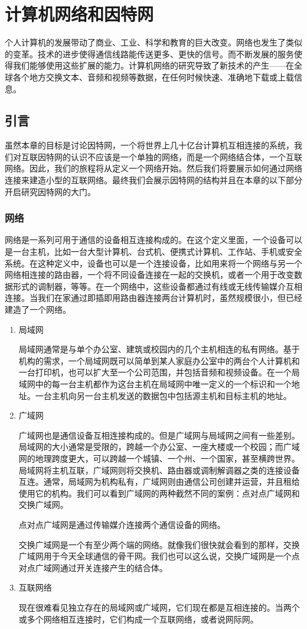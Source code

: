 \chapter{计算机网络和因特网}
个人计算机的发展带动了商业、工业、科学和教育的巨大改变。网络也发生了类似的变革。技术的进步使得通信线路能传送更多、更快的信号。而不断发展的服务使得我们能够使用这些扩展的能力。计算机网络的研究导致了新技术的产生——在全球各个地方交换文本、音频和视频等数据，在任何时候快速、准确地下载或上载信息。
\section{引言}
虽然本章的目标是讨论因特网，一个将世界上几十亿台计算机互相连接的系统，我们对互联因特网的认识不应该是一个单独的网络，而是一个网络结合体，一个互联网络。因此，我们的旅程将从定义一个网络开始。然后我们将要展示如何通过网络连接来建造小型的互联网络。最终我们会展示因特网的结构并且在本章的以下部分开启研究因特网的大门。
\subsection{网络}
网络是一系列可用于通信的设备相互连接构成的。在这个定义里面，一个设备可以是一台主机，比如一台大型计算机、台式机、便携式计算机、工作站、手机或安全系统。在这种定义中，设备也可以是一个连接设备，比如用来将一个网络与另一个网络相连接的路由器，一个将不同设备连接在一起的交换机，或者一个用于改变数据形式的调制器，等等。在一个网络中，这些设备都通过有线或无线传输媒介互相连接。当我们在家通过即插即用路由器连接两台计算机时，虽然规模很小，但已经建造了一个网络。
\begin{enumerate}
	\item 局域网

	局域网通常是与单个办公室、建筑或校园内的几个主机相连的私有网络。基于机构的需求，一个局域网既可以简单到某人家庭办公室中的两台个人计算机和一台打印机，也可以扩大至一个公司范围，并包括音频和视频设备。在一个局域网中的每一台主机都作为这台主机在局域网中唯一定义的一个标识和一个地址。一台主机向另一台主机发送的数据包中包括源主机和目标主机的地址。

	\item 广域网

	广域网也是通信设备互相连接构成的。但是广域网与局域网之间有一些差别。局域网的大小通常是受限的，跨越一个办公室、一座大楼或一个校园；而广域网的地理跨度更大，可以跨越一个城镇、一个州、一个国家，甚至横跨世界。局域网将主机互联，广域网则将交换机、路由器或调制解调器之类的连接设备互连。通常，局域网为机构私有，广域网则由通信公司创建并运营，并且租给使用它的机构。我们可以看到广域网的两种截然不同的案例：点对点广域网和交换广域网。

	点对点广域网是通过传输媒介连接两个通信设备的网络。

	交换广域网是一个有至少两个端的网络。就像我们很快就会看到的那样，交换广域网用于今天全球通信的骨干网。我们也可以这么说，交换广域网是一个点对点广域网通过开关连接产生的结合体。

	\item 互联网络

	现在很难看见独立存在的局域网或广域网，它们现在都是互相连接的。当两个或多个网络相互连接时，它们构成一个互联网络，或者说网际网。
\end{enumerate}

